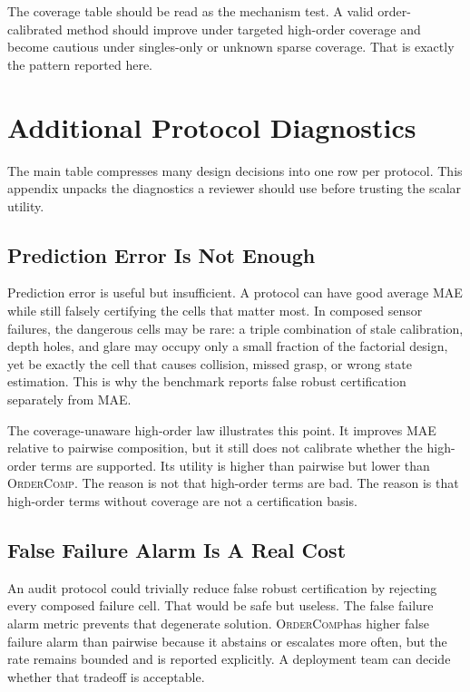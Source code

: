 \documentclass{article}
\newcommand{\method}{\textsc{OrderComp}}
\begin{document}
The coverage table should be read as the mechanism test. A valid order-calibrated method should improve under targeted high-order coverage and become cautious under singles-only or unknown sparse coverage. That is exactly the pattern reported here.

\section{Additional Protocol Diagnostics}

The main table compresses many design decisions into one row per protocol. This appendix unpacks the diagnostics a reviewer should use before trusting the scalar utility.

\subsection{Prediction Error Is Not Enough}

Prediction error is useful but insufficient. A protocol can have good average MAE while still falsely certifying the cells that matter most. In composed sensor failures, the dangerous cells may be rare: a triple combination of stale calibration, depth holes, and glare may occupy only a small fraction of the factorial design, yet be exactly the cell that causes collision, missed grasp, or wrong state estimation. This is why the benchmark reports false robust certification separately from MAE.

The coverage-unaware high-order law illustrates this point. It improves MAE relative to pairwise composition, but it still does not calibrate whether the high-order terms are supported. Its utility is higher than pairwise but lower than \method. The reason is not that high-order terms are bad. The reason is that high-order terms without coverage are not a certification basis.

\subsection{False Failure Alarm Is A Real Cost}

An audit protocol could trivially reduce false robust certification by rejecting every composed failure cell. That would be safe but useless. The false failure alarm metric prevents that degenerate solution. \method has higher false failure alarm than pairwise because it abstains or escalates more often, but the rate remains bounded and is reported explicitly. A deployment team can decide whether that tradeoff is acceptable.
\end{document}
